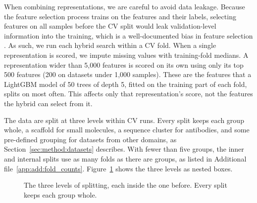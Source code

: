When combining representations, we are careful to avoid data leakage. Because the feature selection process trains on the features and their labels, selecting features on all samples before the CV split would leak validation-level information into the training, which is a well-documented bias in feature selection  \citep{Ambroise2002, Vabalas2019}. As such, we run each hybrid search within a CV fold. When a single representation is scored, we impute missing values with training-fold medians. A representation wider than 5,000 features is scored on its own using only its top 500 features (200 on datasets under 1,000 samples). These are the features that a LightGBM model of 50 trees of depth 5, fitted on the training part of each fold, splits on most often. This affects only that representation's score, not the features the hybrid can select from it.

The data are split at three levels within CV runs. Every split keeps each group whole, a scaffold for small molecules, a sequence cluster for antibodies, and some pre-defined grouping for datasets from other domains, as Section~\ref{sec:method:datasets} describes.
With fewer than five groups, the inner and internal splits use as many folds as there are groups, as listed in Additional file~\ref{app:add:fold_counts}. Figure~\ref{fig:split_levels} shows the three levels as nested boxes.

\begin{figure}[htbp]
\centering
\small
{}
\caption[The three levels of splitting.]{The three levels of splitting, each inside the one before. Every split keeps each group whole.}
\label{fig:split_levels}
\end{figure}

